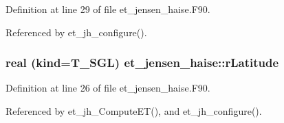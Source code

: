 Definition at line 29 of file et\_\-jensen\_\-haise.F90.



Referenced by et\_\-jh\_\-configure().

\hypertarget{namespaceet__jensen__haise_af549b1e8ee92983a6b3eddf4c927efcf}{
\subsubsection[{rLatitude}]{\setlength{\rightskip}{0pt plus 5cm}real (kind=T\_\-SGL) {\bf et\_\-jensen\_\-haise::rLatitude}}}
\label{namespaceet__jensen__haise_af549b1e8ee92983a6b3eddf4c927efcf}


Definition at line 26 of file et\_\-jensen\_\-haise.F90.



Referenced by et\_\-jh\_\-ComputeET(), and et\_\-jh\_\-configure().

